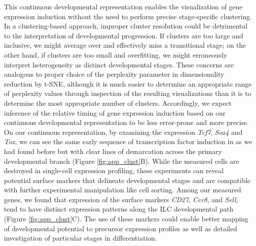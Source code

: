 \begin{subappendices}
This continuous developmental representation enables the visualization of gene expression induction without the need to perform precise stage-specific clustering. In a clustering-based approach, improper cluster resolution could be detrimental to the interpretation of developmental progression. If clusters are too large and inclusive, we might average over and effectively miss a transitional stage; on the other hand, if clusters are too small and overfitting, we might erroneously interpret heterogeneity as distinct developmental stages. These concerns are analogous to proper choice of the perplexity parameter in dimensionality reduction by t-SNE, although it is much easier to determine an appropriate range of perplexity values through inspection of the resulting visualizations than it is to determine the most appropriate number of clusters. Accordingly, we expect inference of the relative timing of gene expression induction based on our continuous developmental representation to be less error-prone and more precise. On our continuous representation, by examining the expression \textit{Tcf7}, \textit{Sox4} and \textit{Tox}, we can see the same early sequence of transcription factor induction in \aLP as we had found before but with clear lines of demarcation across the primary developmental branch (Figure \ref{fig:app_clust}B). While the measured cells are destroyed in single-cell expression profiling, these experiments can reveal potential surface markers that delineate developmental stages and are compatible with further experimental manipulation like cell sorting. Among our measured genes, we found that expression of the surface markers \textit{CD27}, \textit{Ccr8}, and \textit{Sell}, tend to have distinct expression patterns along the ILC developmental path (Figure \ref{fig:app_clust}C). The use of these markers could enable better mapping of developmental potential to precursor expression profiles as well as detailed investigation of particular stages in differentiation.


\end{subappendices}
